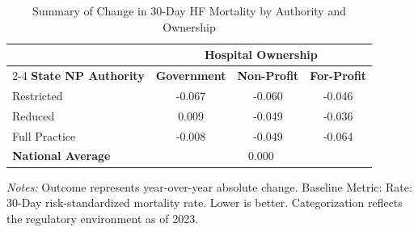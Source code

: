 \begin{table}[htbp]
    \centering
    \caption{Summary of Change in 30-Day HF Mortality by Authority and Ownership}
    \label{tab:d_mortality_rate_hf_own}
    \vspace{0.2cm}
    \begin{tabular}{lccc}
        \toprule
        & \multicolumn{3}{c}{\textbf{Hospital Ownership}} \\
        \cmidrule(lr){2-4}
        \textbf{State NP Authority} & \textbf{Government} & \textbf{Non-Profit} & \textbf{For-Profit} \\
        \midrule
        Restricted & -0.067 & -0.060 & -0.046 \\
        Reduced & 0.009 & -0.049 & -0.036 \\
        Full Practice & -0.008 & -0.049 & -0.064 \\
        \midrule
        \textbf{National Average} & \multicolumn{3}{c}{0.000} \\
        \bottomrule
    \end{tabular}
    \vspace{0.1cm}
    \begin{minipage}{0.85\textwidth}
        \footnotesize \textit{Notes:} Outcome represents year-over-year absolute change. Baseline Metric: Rate: 30-Day risk-standardized mortality rate. Lower is better. Categorization reflects the regulatory environment as of 2023.
    \end{minipage}
\end{table}